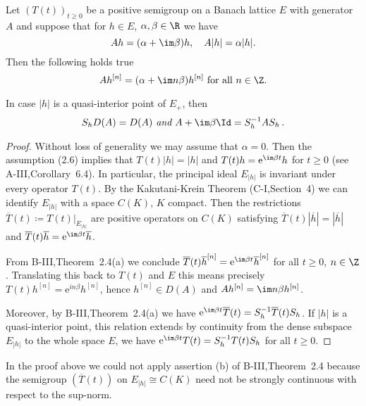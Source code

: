 \begin{theorem}\label{thm:c3-2.2}
	Let $(T(t))_{t\geq 0}$ be a positive semigroup on a Banach lattice $E$ with generator $A$ and suppose that for $h \in E$, $\alpha,\beta \in \R $ we have
	\begin{equation}\label{eq:c3-2.6}
		Ah = (\alpha+\im\beta )h, \quad A|h| = \alpha|h|.
	\end{equation}
%
Then the following holds true
\begin{equation}\label{eq:c3-2.7}
	Ah^{[n]} = (\alpha+\im n\beta)h^{[n]} \text{ for all } n \in \Z.
\end{equation}

In case $|h|$ is a quasi-interior point of $E_{+}$, then 
\[
S_{h}D(A) = D(A) \textit{ and } A + \im\beta \Id = S_{h}^{-1}AS_{h}\,.
\]
\end{theorem}
\begin{proof}
	Without loss of generality we may assume that $\alpha = 0$.
	Then the assumption (2.6) implies that $T(t)|h| = |h|$ and $T(t)h = \mathrm{e}^{\im\beta t}h$ for $t \geq 0$ (see A-III,Corollary~6.4).
	In particular, the principal ideal $E_{|h|}$ is invariant under every operator $T(t)$.
	By the Kakutani-Krein Theorem (C-I,Section~4) we can identify $E_{|h|}$ with a space $C(K)$, $K$ compact.
	Then the restrictions $\overline{T}(t) \coloneq T(t)|_{E_{|h|}}$ are positive operators on $C(K)$ satisfying $\overline{T}(t)|\overline{h}| = |\overline{h}|$ and $\overline{T}(t)\overline{h} = \mathrm{e}^{\im\beta  t}\overline{h}$.
	
	From B-III,Theorem~2.4(a) we conclude $\overline{T}(t)\overline{h}^{[n]} = \mathrm{e}^{\im\beta  t}\overline{h}^{[n]}$ for all $t \geq 0$, $n \in \Z$.
	Translating this back to $T(t)$ and $E$ this means precisely $T(t)h^{[n]} = \mathrm{e}^{in\beta}h^{[n]}$, hence $h^{[n]} \in D(A)$ and $Ah^{[n]} = \im  n\beta h^{[n]}$.
	
	Moreover, by B-III,Theorem~2.4(a) we have $\mathrm{e}^{\im\beta  t}\overline{T}(t) = S_{h}^{-1}\overline{T}(t)S_{h}$.
	If $|h|$ is a quasi-interior point, this relation extends by continuity from the dense subspace $E_{|h|}$ to the whole space $E$, \ie  we have $\mathrm{e}^{\im\beta  t}T(t) = S_{h}^{-1}T(t)S_{h}$ for all $t \geq 0$.
\end{proof}

In the proof above we could not apply assertion (b) of B-III,Theorem~2.4 because the semigroup $(\overline{T}(t))$ on $E_{|h|} \cong C(K)$ need not be strongly continuous with respect to the sup-norm.

